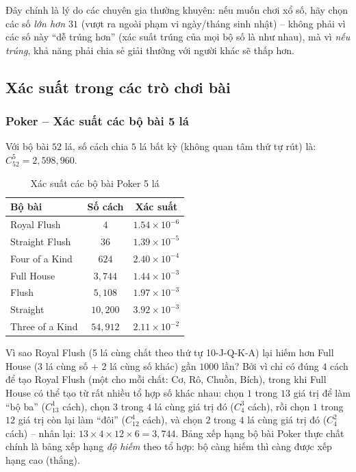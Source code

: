 \documentclass[12pt,a4paper]{article}
\theoremstyle{coloredthm}
\theoremstyle{coloreddef}
\theoremstyle{remark}
\begin{document}
\begin{ungdung}
Đây chính là lý do các chuyên gia thường khuyên: nếu muốn chơi xổ số, hãy chọn các số \emph{lớn hơn $31$} (vượt ra ngoài phạm vi ngày/tháng sinh nhật) -- không phải vì các số này ``dễ trúng hơn'' (xác suất trúng của mọi bộ số là như nhau), mà vì \emph{nếu trúng}, khả năng phải chia sẻ giải thưởng với người khác sẽ thấp hơn.
\end{ungdung}

\subsection{Xác suất trong các trò chơi bài}

\subsubsection{Poker -- Xác suất các bộ bài 5 lá}
Với bộ bài $52$ lá, số cách chia $5$ lá bất kỳ (không quan tâm thứ tự rút) là: $C_{52}^5 = 2{,}598{,}960$.

\begin{table}[H]
\centering
\caption{Xác suất các bộ bài Poker 5 lá}
\begin{tabular}{l c c}
\toprule
\textbf{Bộ bài} & \textbf{Số cách} & \textbf{Xác suất} \\
\midrule
Royal Flush     & $4$ & $1.54\times 10^{-6}$ \\
Straight Flush  & $36$ & $1.39\times 10^{-5}$ \\
Four of a Kind  & $624$ & $2.40\times 10^{-4}$ \\
Full House      & $3{,}744$ & $1.44\times 10^{-3}$ \\
Flush           & $5{,}108$ & $1.97\times 10^{-3}$ \\
Straight        & $10{,}200$ & $3.92\times 10^{-3}$ \\
Three of a Kind & $54{,}912$ & $2.11\times 10^{-2}$ \\
\bottomrule
\end{tabular}
\end{table}

\begin{giaithich}
Vì sao Royal Flush (5 lá cùng chất theo thứ tự 10-J-Q-K-A) lại hiếm hơn Full House (3 lá cùng số + 2 lá cùng số khác) gần $1000$ lần? Bởi vì chỉ có đúng $4$ cách để tạo Royal Flush (một cho mỗi chất: Cơ, Rô, Chuồn, Bích), trong khi Full House có thể tạo từ rất nhiều tổ hợp số khác nhau: chọn $1$ trong $13$ giá trị để làm ``bộ ba'' ($C_{13}^1$ cách), chọn $3$ trong $4$ lá cùng giá trị đó ($C_4^3$ cách), rồi chọn $1$ trong $12$ giá trị còn lại làm ``đôi'' ($C_{12}^1$ cách), và chọn $2$ trong $4$ lá cùng giá trị đó ($C_4^2$ cách) -- nhân lại: $13 \times 4 \times 12 \times 6 = 3{,}744$. Bảng xếp hạng bộ bài Poker thực chất chính là bảng xếp hạng \emph{độ hiếm} theo tổ hợp: bộ càng hiếm thì càng được xếp hạng cao (thắng).
\end{giaithich}
\end{document}
